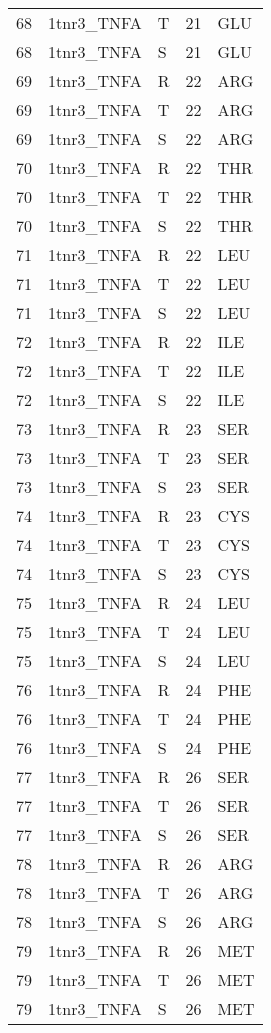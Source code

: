 \begin{longtable}[l]{l|l|l|l|l}
	68 & 1tnr3_TNFA & T & 21 & GLU \\
	68 & 1tnr3_TNFA & S & 21 & GLU \\
	69 & 1tnr3_TNFA & R & 22 & ARG \\
	69 & 1tnr3_TNFA & T & 22 & ARG \\
	69 & 1tnr3_TNFA & S & 22 & ARG \\
	70 & 1tnr3_TNFA & R & 22 & THR \\
	70 & 1tnr3_TNFA & T & 22 & THR \\
	70 & 1tnr3_TNFA & S & 22 & THR \\
	71 & 1tnr3_TNFA & R & 22 & LEU \\
	71 & 1tnr3_TNFA & T & 22 & LEU \\
	71 & 1tnr3_TNFA & S & 22 & LEU \\
	72 & 1tnr3_TNFA & R & 22 & ILE \\
	72 & 1tnr3_TNFA & T & 22 & ILE \\
	72 & 1tnr3_TNFA & S & 22 & ILE \\
	73 & 1tnr3_TNFA & R & 23 & SER \\
	73 & 1tnr3_TNFA & T & 23 & SER \\
	73 & 1tnr3_TNFA & S & 23 & SER \\
	74 & 1tnr3_TNFA & R & 23 & CYS \\
	74 & 1tnr3_TNFA & T & 23 & CYS \\
	74 & 1tnr3_TNFA & S & 23 & CYS \\
	75 & 1tnr3_TNFA & R & 24 & LEU \\
	75 & 1tnr3_TNFA & T & 24 & LEU \\
	75 & 1tnr3_TNFA & S & 24 & LEU \\
	76 & 1tnr3_TNFA & R & 24 & PHE \\
	76 & 1tnr3_TNFA & T & 24 & PHE \\
	76 & 1tnr3_TNFA & S & 24 & PHE \\
	77 & 1tnr3_TNFA & R & 26 & SER \\
	77 & 1tnr3_TNFA & T & 26 & SER \\
	77 & 1tnr3_TNFA & S & 26 & SER \\
	78 & 1tnr3_TNFA & R & 26 & ARG \\
	78 & 1tnr3_TNFA & T & 26 & ARG \\
	78 & 1tnr3_TNFA & S & 26 & ARG \\
	79 & 1tnr3_TNFA & R & 26 & MET \\
	79 & 1tnr3_TNFA & T & 26 & MET \\
	79 & 1tnr3_TNFA & S & 26 & MET \\

\end{longtable}
